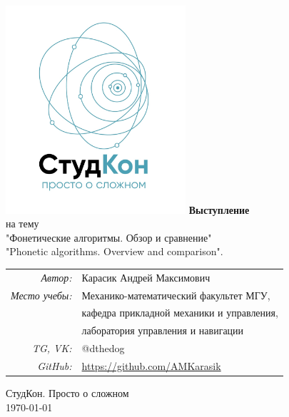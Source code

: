 \documentclass[titlepage,12pt]{article}
\begin{document}
\begin{titlepage}
    \thispagestyle{empty}
    
        \noindent%
    \begin{center}
        \includegraphics[width=0.5\textwidth]{white_logo_SC.jpg}
        \vfill
    	\Huge{\textbf{Выступление}}\\[.5em]
    	\normalsize на тему\\[.5em]
    	"Фонетические алгоритмы. Обзор и сравнение"\\
    	\normalsize
    	"Phonetic algorithms. Overview and comparison".\\[3em]
    	\normalsize
    	
        \vfill
        \begin{flushright}
            \begin{tabular}{rl}
                
                \emph{Автор:} & Карасик Андрей Максимович \\
                \emph{Место учебы:} & Механико-математический факультет МГУ, \\ & кафедра прикладной механики и управления,\\ & лаборатория управления и навигации \\
                \emph{TG, VK:} & @dthedog \\
                \emph{GitHub:} & \url{https://github.com/AMKarasik}
            \end{tabular}
        \end{flushright}
        \vfill
        
    	СтудКон. Просто о сложном\\[.5cm]
        {\today}
    \end{center}
\end{titlepage}
\setcounter{page}{2}
\end{document}
